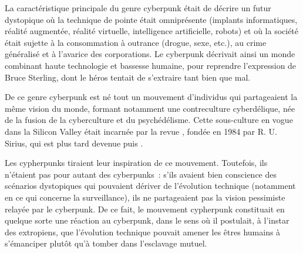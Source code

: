 La caractéristique principale du genre cyberpunk était de décrire un futur dystopique où la technique de pointe était omniprésente (implants informatiques, réalité augmentée, réalité virtuelle, intelligence artificielle, robots) et où la société était sujette à la consommation à outrance (drogue, sexe, etc.), au crime généralisé et à l'avarice des corporations. Le cyberpunk décrivait ainsi un monde combinant haute technologie et bassesse humaine, pour reprendre l'expression de Bruce Sterling, dont le héros tentait de s'extraire tant bien que mal. %

De ce genre cyberpunk est né tout un mouvement d'individus qui partageaient la même vision du monde, formant notamment une contreculture cyberdélique, née de la fusion de la cyberculture et du psychédélisme. Cette sous-culture en vogue dans la Silicon Valley était incarnée par la revue , fondée en 1984 par R. U. Sirius, qui est plus tard devenue  puis .

Les cypherpunks tiraient leur inspiration de ce mouvement. Toutefois, ils n'étaient pas pour autant des cyberpunks~: s'ils avaient bien conscience des scénarios dystopiques qui pouvaient dériver de l'évolution technique (notamment en ce qui concerne la surveillance), ils ne partageaient pas la vision pessimiste relayée par le cyberpunk. De ce fait, le mouvement cypherpunk constituait en quelque sorte une réaction au cyberpunk, dans le sens où il postulait, à l'instar des extropiens, que l'évolution technique pouvait amener les êtres humains à s'émanciper plutôt qu'à tomber dans l'esclavage mutuel.

